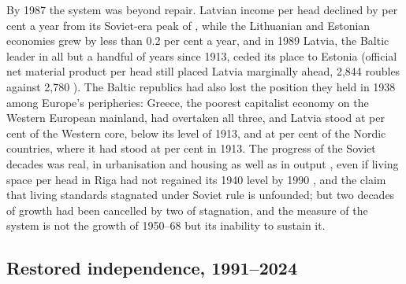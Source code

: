 By 1987 the system was beyond repair. Latvian income per head declined by  per cent a year from its Soviet-era peak of \lvSOVPEAKyear{}, while the Lithuanian and Estonian economies grew by less than 0.2 per cent a year, and in 1989 Latvia, the Baltic leader in all but a handful of years since 1913, ceded its place to Estonia (official net material product per head still placed Latvia marginally ahead, 2,844 roubles against 2,780 \parencite[156]{norkus_2023_baltic}). The Baltic republics had also lost the position they held in 1938 among Europe's peripheries: Greece, the poorest capitalist economy on the Western European mainland, had overtaken all three, and Latvia stood at  per cent of the Western core, below its level of 1913, and at  per cent of the Nordic countries, where it had stood at  per cent in 1913. The progress of the Soviet decades was real, in urbanisation and housing as well as in output \parencite[226]{krisjane_2019_residential}, even if living space per head in Riga had not regained its 1940 level by 1990 \parencite[174]{treija_2019_socialist}, and the claim that living standards stagnated under Soviet rule is unfounded; but two decades of growth had been cancelled by two of stagnation, and the measure of the system is not the growth of 1950--68 but its inability to sustain it.

\subsection{Restored independence, 1991--2024}

